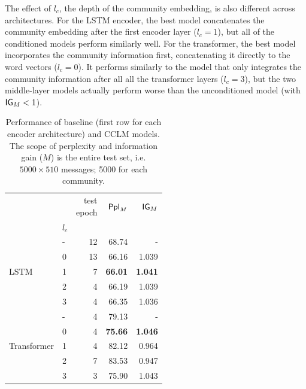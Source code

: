 \documentclass[11pt]{article}
\begin{document}
The effect of $l_c$, the depth of the community embedding,
is also different across architectures.
For the LSTM encoder, 
the best model concatenates the community embedding after the first encoder layer ($l_c=1$),
but all of the conditioned models perform similarly well.
For the transformer, the best model incorporates the community information
first, concatenating it directly to the word vectors ($l_c=0$).
It performs similarly to the model that only integrates the community information
after all all the transformer layers ($l_c=3$),
but the two middle-layer models actually perform worse than the unconditioned model
(with $\mathsf{IG}_M < 1$).

\begin{table}
  \small
  \centering
  \begin{tabular}{llrrr}
  \toprule
                                 &       & \makecell{test \\ epoch} & $\mathsf{Ppl}_M$ & $\mathsf{IG}_M$     \\
                                 & $l_c$ &         &                 &                   \\
  \midrule
  \multirow{5}{*}{LSTM}         & - &          12 &  68.74          &       -           \\
                                & 0 &          13 &  66.16          &    1.039          \\
                                & 1 &           7 &  \textbf{66.01} &    \textbf{1.041} \\
                                & 2 &           4 &  66.19          &    1.039          \\
                                & 3 &           4 &  66.35          &    1.036          \\
  \midrule
  \multirow{5}{*}{Transformer}  & - &           4 &  79.13          &        -          \\
                                & 0 &           4 &  \textbf{75.66} &    \textbf{1.046} \\
                                & 1 &           4 &  82.12          &    0.964          \\
                                & 2 &           7 &  83.53          &    0.947          \\
                                & 3 &           3 &  75.90          &    1.043          \\
  \bottomrule
  \end{tabular}
  \caption{
    Performance of baseline (first row for each encoder architecture)
    and CCLM models.  The scope of perplexity and information gain
    ($M$) is the entire test set, i.e. $5000×510$ messages; \num{5000}
    for each community.}
  \label{tab:model-results}
\end{table}
\end{document}
